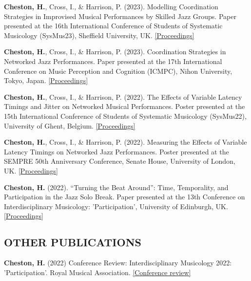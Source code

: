 \documentclass[11pt]{res_academic} %
\begin{document}
\begin{resume}
\begin{hangparas}{.25in}{1}
\textbf{Cheston, H.}, Cross, I., \& Harrison, P. (2023). Modelling Coordination Strategies in Improvised Musical Performances by Skilled Jazz Groups. Paper presented at the 16th International Conference of Students of Systematic Musicology (SysMus23), Sheffield University, UK. \href{https://drive.google.com/file/d/14F5Xe8qfxfWpMW6pGuIl8fcaIYbmFDtt/view}{[Proceedings]}

\textbf{Cheston, H.}, Cross, I., \& Harrison, P. (2023). Coordination Strategies in Networked Jazz Performances. Paper presented at the 17th International Conference on Music Perception and Cognition (ICMPC), Nihon University, Tokyo, Japan. \href{https://icmpc17.com/proceedings-in-zip/ICMPC17-APSCOM7-e-Proceedings.zip/}{[Proceedings]}

\textbf{Cheston, H.}, Cross, I., \& Harrison, P. (2022). The Effects of Variable Latency Timings and Jitter on Networked Musical Performances. Poster presented at the 15th International Conference of Students of Systematic Musicology (SysMus22), University of Ghent, Belgium. \href{http://hdl.handle.net/1854/LU-01GVD6WBCVPGRAHMNYR1CEXF57}{[Proceedings]}

\textbf{Cheston, H.}, Cross, I., \& Harrison, P. (2022). Measuring the Effects of Variable Latency Timings on Networked Jazz Performances. Poster presented at the SEMPRE 50th Anniversary Conference, Senate House, University of London, UK. \href{https://drive.google.com/file/d/1P72Orm1gqSI4_gOah3Ueb9fdCpriVY_M/view}{[Proceedings]}

\textbf{Cheston, H.} (2022). “Turning the Beat Around”: Time, Temporality, and Participation in the Jazz Solo Break. Paper presented at the 13th Conference on Interdisciplinary Musicology: 'Participation', University of Edinburgh, UK. \href{http://journals.ed.ac.uk/CIM22-Proceedings}{[Proceedings]}
\end{hangparas}

\subsection{OTHER PUBLICATIONS}\vspace{-8pt}
\begin{hangparas}{.25in}{1}
\textbf{Cheston, H.} (2022) Conference Review: Interdisciplinary Musicology 2022: 'Participation'. Royal Musical Association. \href{https://www.rma.ac.uk/2022/06/23/conference-review-interdisciplinary-musicology-2022-participation/}{[Conference review]}
\end{hangparas}



\end{resume}
\end{document}
